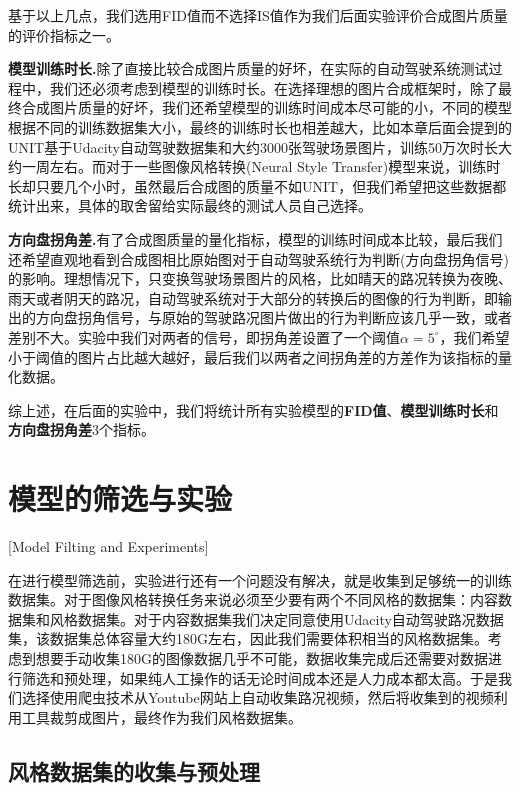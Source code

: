 基于以上几点，我们选用FID值而不选择IS值作为我们后面实验评价合成图片质量的评价指标之一。

\textbf{模型训练时长.}\quad 除了直接比较合成图片质量的好坏，在实际的自动驾驶系统测试过程中，我们还必须考虑到模型的训练时长。在选择理想的图片合成框架时，除了最终合成图片质量的好坏，我们还希望模型的训练时间成本尽可能的小，不同的模型根据不同的训练数据集大小，最终的训练时长也相差越大，比如本章后面会提到的UNIT\cite{UNIT}基于Udacity自动驾驶数据集\cite{udacity_dataset}和大约3000张驾驶场景图片，训练50万次时长大约一周左右。而对于一些图像风格转换(Neural Style Transfer)模型来说，训练时长却只要几个小时，虽然最后合成图的质量不如UNIT，但我们希望把这些数据都统计出来，具体的取舍留给实际最终的测试人员自己选择。 

\textbf{方向盘拐角差.}\quad 有了合成图质量的量化指标，模型的训练时间成本比较，最后我们还希望直观地看到合成图相比原始图对于自动驾驶系统行为判断(方向盘拐角信号)的影响。理想情况下，只变换驾驶场景图片的风格，比如晴天的路况转换为夜晚、雨天或者阴天的路况，自动驾驶系统对于大部分的转换后的图像的行为判断，即输出的方向盘拐角信号，与原始的驾驶路况图片做出的行为判断应该几乎一致，或者差别不大。实验中我们对两者的信号，即拐角差设置了一个阈值$\alpha=5^{\circ}$，我们希望小于阈值的图片占比越大越好，最后我们以两者之间拐角差的方差作为该指标的量化数据。

综上述，在后面的实验中，我们将统计所有实验模型的\textbf{FID值}、\textbf{模型训练时长}和\textbf{方向盘拐角差}3个指标。 


\section{模型的筛选与实验}[Model Filting and Experiments]

在进行模型筛选前，实验进行还有一个问题没有解决，就是收集到足够统一的训练数据集。对于图像风格转换任务来说必须至少要有两个不同风格的数据集：内容数据集和风格数据集。对于内容数据集我们决定同意使用Udacity自动驾驶路况数据集\cite{udacity_dataset}，该数据集总体容量大约180G左右，因此我们需要体积相当的风格数据集。考虑到想要手动收集180G的图像数据几乎不可能，数据收集完成后还需要对数据进行筛选和预处理，如果纯人工操作的话无论时间成本还是人力成本都太高。于是我们选择使用爬虫技术从Youtube网站上自动收集路况视频，然后将收集到的视频利用工具裁剪成图片，最终作为我们风格数据集。

\subsection{风格数据集的收集与预处理}

